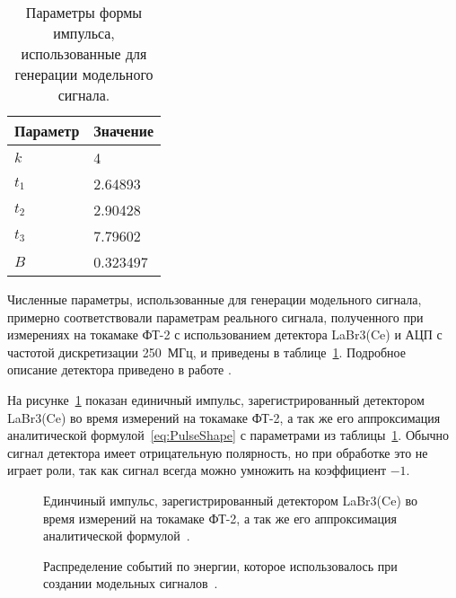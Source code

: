 \begin{table} [htbp]
    \centering
    \begin{threeparttable}
        \caption{Параметры формы импульса, использованные для генерации модельного сигнала.}
        \label{tab:PulseShapeFt2}
        \begin{tabular}{| p{3cm} | p{3cm} |}
            \hline
            Параметр   & Значение \\
            \hline
            $k$ & 4  \\
            $t_1$ & 2.64893 \\
            $t_2$ & 2.90428 \\
            $t_3$ & 7.79602 \\
            $B$ & 0.323497 \\
            \hline
        \end{tabular}
    \end{threeparttable}
\end{table}

Численные параметры, использованные для генерации модельного сигнала, примерно соответствовали параметрам реального сигнала, полученного при измерениях на токамаке ФТ-2 с использованием детектора LaBr3(Ce) и АЦП с частотой дискретизации 250~МГц, и приведены в таблице~\ref{tab:PulseShapeFt2}. Подробное описание детектора приведено в работе \cite{Shevelev2017}. 

На рисунке~\ref{fig:pulseShapeFt2} показан единичный импульс, зарегистрированный детектором LaBr3(Ce) во время измерений на токамаке ФТ-2, а так же его аппроксимация аналитической формулой~\ref{eq:PulseShape} с параметрами из таблицы~\ref{tab:PulseShapeFt2}. Обычно сигнал детектора имеет отрицательную полярность, но при обработке это не играет роли, так как сигнал всегда можно умножить на коэффициент $-1$. 

\begin{figure}[ht!]
  \caption{ Единчиный импульс, зарегистрированный детектором LaBr3(Ce) во время измерений на токамаке ФТ-2, а так же его аппроксимация аналитической формулой~\cite{Khilkevitch2020}.}
  \label{fig:pulseShapeFt2}
\end{figure}

\begin{figure}[ht!]
  \caption{ Распределение событий по энергии, которое использовалось при создании модельных сигналов~\cite{Khilkevitch2020}.}
  \label{fig:testModelSpectrum}
\end{figure}

